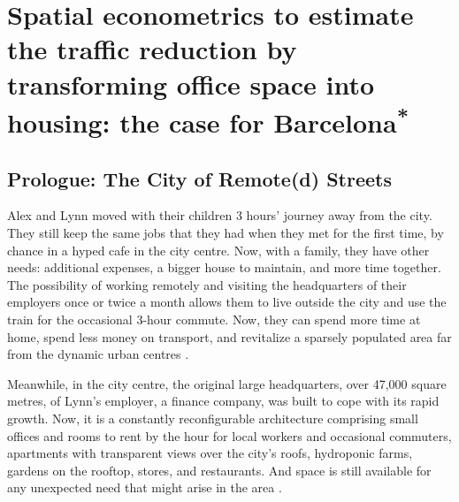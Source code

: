 \chapter{Spatial econometrics to estimate the traffic reduction by transforming office space into housing: the case for Barcelona\textsuperscript{*}}
\label{ch:ETRCO2H}
\graphicspath{{chapters/04_ETRCO2H/figures/}}

\section*{Prologue: The City of Remote(d) Streets}


Alex and Lynn moved with their children 3 hours’ journey away from the city. They still keep the same jobs that they had when they met for the first time, by chance in a hyped cafe in the city centre. Now, with a family, they have other needs: additional expenses, a bigger house to maintain, and more time together. The possibility of working remotely and visiting the headquarters of their employers once or twice a month allows them to live outside the city and use the train for the occasional 3-hour commute. Now, they can spend more time at home, spend less money on transport, and revitalize a sparsely populated area far from the dynamic urban centres \citep{Johnson2003, Zenkteler2019Home-basedResponse}.

Meanwhile, in the city centre, the original large headquarters, over 47,000 square metres, of Lynn’s employer, a finance company, was built to cope with its rapid growth. Now, it is a constantly reconfigurable architecture \citep{Steenson2017CedricPrice} comprising small offices and rooms to rent by the hour for local workers and occasional commuters, apartments with transparent views over the city’s roofs, hydroponic farms, gardens on the rooftop, stores, and restaurants. And space is still available for any unexpected need that might arise in the area \citep{Schneebeli2021a}. 

